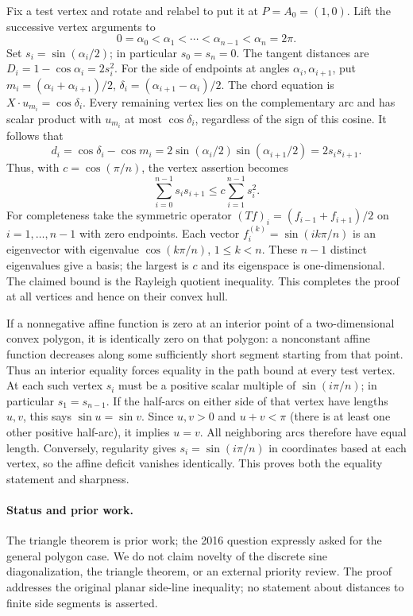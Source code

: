 \documentclass[11pt,a4paper]{article}
\numberwithin{equation}{section}
\theoremstyle{definition}
\theoremstyle{remark}
\begin{document}
Fix a test vertex and rotate and relabel to put it at $P=A_0=(1,0)$. Lift the successive vertex arguments to
\[
 0=\alpha_0<\alpha_1<\cdots<\alpha_{n-1}<\alpha_n=2\pi.
\]
Set $s_i=\sin(\alpha_i/2)$; in particular $s_0=s_n=0$. The tangent distances are $D_i=1-\cos\alpha_i=2s_i^2$. For the side of endpoints at angles $\alpha_i,\alpha_{i+1}$, put $m_i=(\alpha_i+\alpha_{i+1})/2$, $\delta_i=(\alpha_{i+1}-\alpha_i)/2$. The chord equation is $X\cdot u_{m_i}=\cos\delta_i$. Every remaining vertex lies on the complementary arc and has scalar product with $u_{m_i}$ at most $\cos\delta_i$, regardless of the sign of this cosine. It follows that
\[
 d_i=\cos\delta_i-\cos m_i
     =2\sin(\alpha_i/2)\sin(\alpha_{i+1}/2)=2s_i s_{i+1}.
\]
Thus, with $c=\cos(\pi/n)$, the vertex assertion becomes
\[
 \sum_{i=0}^{n-1}s_i s_{i+1}\le c\sum_{i=1}^{n-1}s_i^2.
\]
For completeness take the symmetric operator $(Tf)_i=(f_{i-1}+f_{i+1})/2$ on $i=1,\ldots,n-1$ with zero endpoints. Each vector $f_i^{(k)}=\sin(ik\pi/n)$ is an eigenvector with eigenvalue $\cos(k\pi/n)$, $1\le k<n$. These $n-1$ distinct eigenvalues give a basis; the largest is $c$ and its eigenspace is one-dimensional. The claimed bound is the Rayleigh quotient inequality. This completes the proof at all vertices and hence on their convex hull.

If a nonnegative affine function is zero at an interior point of a two-dimensional convex polygon, it is identically zero on that polygon: a nonconstant affine function decreases along some sufficiently short segment starting from that point. Thus an interior equality forces equality in the path bound at every test vertex. At each such vertex $s_i$ must be a positive scalar multiple of $\sin(i\pi/n)$; in particular $s_1=s_{n-1}$. If the half-arcs on either side of that vertex have lengths $u,v$, this says $\sin u=\sin v$. Since $u,v>0$ and $u+v<\pi$ (there is at least one other positive half-arc), it implies $u=v$. All neighboring arcs therefore have equal length. Conversely, regularity gives $s_i=\sin(i\pi/n)$ in coordinates based at each vertex, so the affine deficit vanishes identically. This proves both the equality statement and sharpness.

\paragraph{Status and prior work.}
The triangle theorem is prior work; the 2016 question expressly asked for the general polygon case. We do not claim novelty of the discrete sine diagonalization, the triangle theorem, or an external priority review. The proof addresses the original planar side-line inequality; no statement about distances to finite side segments is asserted.
\end{document}
